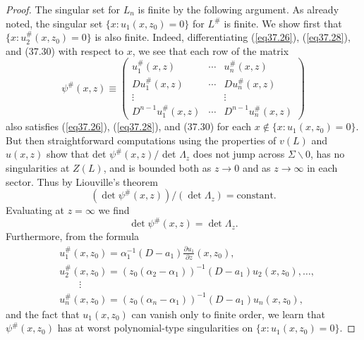\documentclass{surv-l}
\theoremstyle{plain}
\theoremstyle{definition}
\numberwithin{equation}{chapter}
\begin{document}
\begin{proof}
The singular set for $L_{n}$ is finite by the following argument. As already noted, the singular set $\{x:u_{1}(x, z_{0})=0\}$ for $L^{\#}$ is finite. We show first that $\{x : u_{2}^{\#}(x, z_{0})=0\}$ is also finite. Indeed, differentiating (\ref{eq37.26}), (\ref{eq37.28}), and (37.30) with respect to $x$, we see that each row of the matrix
\begin{equation}\label{eq37.43}
\psi^{\#}(x,z)\equiv\left(\begin{array}{ccc}
u_{1}^{\#}(x, z) & \cdots &  u_{n}^{\#}(x, z)\\
Du_{1}^{\#}(x, z) & \cdots &  Du_{n}^{\#}(x,z)\\
\vdots &  & \vdots \\
D^{n-1}u_{1}^{\#}(x, z) & \cdots & D^{n-1}u_{n}^{\#}(x,z)
\end{array}\right)
\end{equation}
also satisfies (\ref{eq37.26}), (\ref{eq37.28}), and (37.30) for each $x\not\in\{x:u_{1}(x,z_{0})=0\}$. But then straightforward computations using the properties of $v(L)$ and $u(x, z)$ show that det $\psi^{\#}(x, z)/$ det $\Lambda_{z}$ does not jump across $\Sigma\backslash 0$, has no singularities at $Z(L)$, and is bounded both as $z\rightarrow 0$ and as $ z\rightarrow\infty$ in each sector. Thus by Liouville's theorem
\begin{equation*}
(\det\psi^{\#}(x, z))/(\det\Lambda_{z})= \mathrm{constant}.
\end{equation*}
Evaluating at $ z=\infty$ we find
\begin{equation}\label{eq37.44}
\det\psi^{\#}(x, z)=\det\Lambda_{z}.
\end{equation}
Furthermore, from the formula
\begin{align}\label{eq37.45}
& u_{1}^{\#}(x,z_{0})=\alpha_{1}^{-1}(D-a_{1})\frac{\partial u_{1}}{\partial z}(x, z_{0}),\\
& u_{2}^{\#}(x, z_{0})=(z_{0}(\alpha_{2}-\alpha_{1}))^{-1}(D-a_{1})u_{2}(x, z_{0}),\ldots,\nonumber \\
&   \qquad \vdots \nonumber \\
& u_{n}^{\#}(x, z_{0})=(z_{0}(\alpha_{n}-\alpha_{1}))^{-1}(D-a_{1})u_{n}(x, z_{0}), \nonumber
\end{align}
and the fact that $u_{1}(x,z_{0})$ can vanish only to finite order, we learn that $\psi^{\#}(x, z_{0})$ has at worst polynomial-type singularities on $\{x:u_{1} (x, z_{0})=0\}$.


\end{proof}
\end{document}
